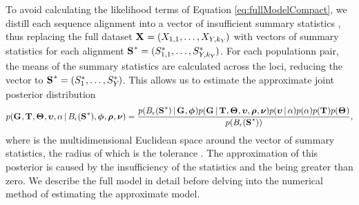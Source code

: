 \documentclass[letterpaper,12pt]{article}
\begin{document}
\begin{linenumbers}
\begin{linenomath}
To avoid calculating the likelihood terms of Equation \ref{eq:fullModelCompact},
we distill each sequence alignment \alignment{}{} into a vector of insufficient
summary statistics \alignmentSS{}{}, thus replacing the full dataset
$\alignmentVector = (\alignment{1}{1}, \ldots,
    \alignment{\npairs{}}{\nloci{\npairs{}}})$
with vectors of summary statistics for each alignment
$\ssVectorObs = (\alignmentSSObs{1}{1}, \ldots,
    \alignmentSSObs{\npairs{}}{\nloci{\npairs{}}})$.
For each populationn pair, the means of the summary statistics are calculated
across the \nloci{} loci, reducing the vector to
$\ssVectorObs = (\alignmentSSObs{1}{}, \ldots,
    \alignmentSSObs{\npairs{}}{})$.
This allows us to estimate the approximate joint posterior distribution
{\small
\begin{equation}
    p(\geneTreeVector, \divTimeMapVector, \demographicParamVector, 
    \locusMutationRateScalarVector, \locusRateHetShapeParameter \given
    \ssSpace, \hkyModelVector, \ploidyScalarVector,
    \mutationRateScalarConstantVector) =
    \frac{p(\ssSpace \given \geneTreeVector, \hkyModelVector)
        p(\geneTreeVector \given \divTimeMapVector, \demographicParamVector,
        \locusMutationRateScalarVector, \ploidyScalarVector,
        \mutationRateScalarConstantVector)
        p(\locusMutationRateScalarVector \given \locusRateHetShapeParameter)
        p(\locusRateHetShapeParameter)
        p(\divTimeMapVector)
        p(\demographicParamVector)}{
        p(\ssSpace)},
    \label{eq:approxModelCompact}
\end{equation}
}
where \ssSpace is the multidimensional Euclidean space around the vector of
summary statistics, the radius of which is the tolerance \tol.
The approximation of this posterior is caused by the insufficiency of the
statistics and the \tol being greater than zero.
We describe the full model in detail before delving into the numerical
method of estimating the approximate model.
\end{linenomath}


\end{linenumbers}
\end{document}

